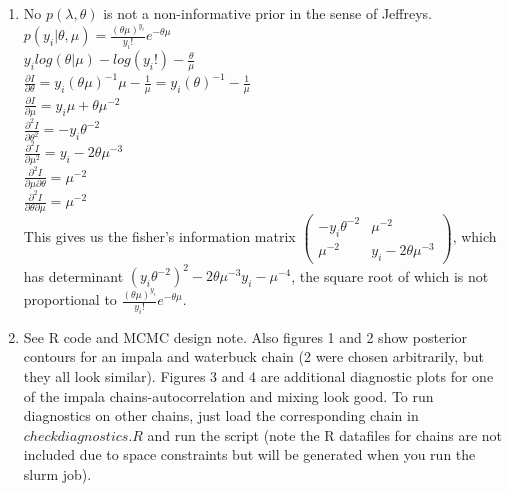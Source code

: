 \documentclass[paper=a4, fontsize=11pt]{scrartcl}
\begin{document}
\begin{enumerate}
\begin{enumerate}[1]
	\item No $p(\lambda, \theta)$ is not a non-informative prior in the sense of Jeffreys.\\ 
	$p(y_i| \theta, \mu) = \frac{(\theta \mu)^{y_{i}}}{y_{i}!} e^{-\theta \mu}$\\
	$y_i log(\theta | \mu ) - log({y_i}!) - \frac{\theta}{\mu}$\\
	$\frac{\partial I}{\partial \theta} = y_i (\theta \mu)^{-1} \mu - \frac{1}{\mu} = 
	y_i (\theta)^{-1} - \frac{1}{\mu}$\\
	$\frac{\partial I}{\partial \mu} = y_i \mu + \theta \mu^{-2}$	\\
	$\frac{\partial^2 I}{\partial \theta^2} = -{y_i}\theta^{-2}$\\
	$\frac{\partial^2 I}{\partial \mu^2} = y_i - 2\theta \mu^{-3}$\\
	$\frac{\partial^2 I}{\partial \mu \partial \theta} = \mu^{-2}$\\
	$\frac{\partial^2 I}{\partial \theta \partial \mu } = \mu^{-2}$\\
	This gives us the fisher's information matrix $\begin{pmatrix}-{y_i}\theta^{-2} & \mu^{-2} \\\mu^{-2} & y_i - 2\theta \mu^{-3} \end{pmatrix}$, which has determinant $({y_i}\theta^{-2})^2 - 2\theta \mu^{-3}y_i - \mu^{-4}$, the square root of which is not proportional to $\frac{(\theta \mu)^{y_{i}}}{y_{i}!} e^{-\theta \mu}$.


	
	\item See R code and MCMC design note. Also figures 1 and 2 show posterior contours for an impala and waterbuck chain (2 were chosen arbitrarily, but they all look similar). Figures 3 and 4 are additional diagnostic plots for one of the impala chains-autocorrelation and mixing look good. To run diagnostics on other chains, just load the corresponding chain in $checkdiagnostics.R$ and run the script (note the R datafiles for chains are not included due to space constraints but will be generated when you run the slurm job).
	

\end{enumerate}
\end{enumerate}
\end{document}
